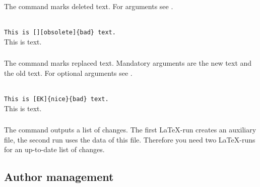 \subsubsection{}
\DescribeMacro{\deleted}

The command  marks deleted text.
For arguments see .

\begin{chusage}
		\>\\
	\usageexample
		\>\texttt{This is [][obsolete]\{bad\} text.}\\
		\>This is  text.
\end{chusage}


\subsubsection{}
\DescribeMacro{\replaced}

The command  marks replaced text.
Mandatory arguments are the new text and the old text.
For optional arguments see .

\begin{chusage}
		\>\\
	\usageexample
		\>\texttt{This is [EK]\{nice\}\{bad\} text.}\\
		\>This is  text.
\end{chusage}



\subsubsection{}
\DescribeMacro{\listofchanges}

The command  outputs a list of changes.
The first \LaTeX-run creates an auxiliary file, the second run uses the data of this file.
Therefore you need two \LaTeX-runs for an up-to-date list of changes.




\subsection{Author management}
\label{sec:user:authormanagement}

